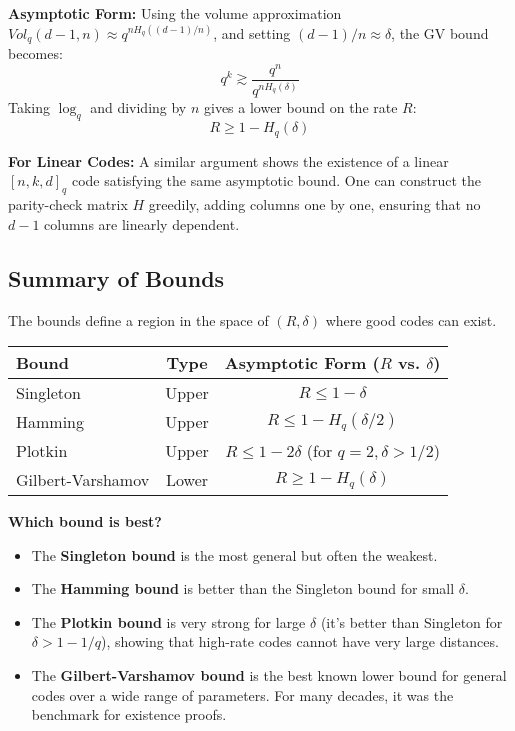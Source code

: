 \textbf{Asymptotic Form:} Using the volume approximation $Vol_q(d-1, n) \approx q^{n H_q((d-1)/n)}$, and setting $(d-1)/n \approx \delta$, the GV bound becomes:
\[ q^k \gtrsim \frac{q^n}{q^{n H_q(\delta)}} \]
Taking $\log_q$ and dividing by $n$ gives a lower bound on the rate $R$:
\[ R \ge 1 - H_q(\delta) \]

\textbf{For Linear Codes:} A similar argument shows the existence of a linear $[n, k, d]_q$ code satisfying the same asymptotic bound. One can construct the parity-check matrix $H$ greedily, adding columns one by one, ensuring that no $d-1$ columns are linearly dependent.

\subsection{Summary of Bounds}

The bounds define a region in the space of $(R, \delta)$ where good codes can exist.

\begin{center}
\begin{tabular}{l|c|c}
\toprule
\textbf{Bound} & \textbf{Type} & \textbf{Asymptotic Form ($R$ vs. $\delta$)} \\
\midrule
Singleton & Upper & $R \le 1 - \delta$ \\
Hamming & Upper & $R \le 1 - H_q(\delta/2)$ \\
Plotkin & Upper & $R \le 1 - 2\delta$ (for $q=2, \delta > 1/2$) \\
Gilbert-Varshamov & Lower & $R \ge 1 - H_q(\delta)$ \\
\bottomrule
\end{tabular}
\end{center}


\textbf{Which bound is best?}
\begin{itemize}
    \item The \textbf{Singleton bound} is the most general but often the weakest.
    \item The \textbf{Hamming bound} is better than the Singleton bound for small $\delta$.
    \item The \textbf{Plotkin bound} is very strong for large $\delta$ (it's better than Singleton for $\delta > 1-1/q$), showing that high-rate codes cannot have very large distances.
    \item The \textbf{Gilbert-Varshamov bound} is the best known lower bound for general codes over a wide range of parameters. For many decades, it was the benchmark for existence proofs.
\end{itemize}
